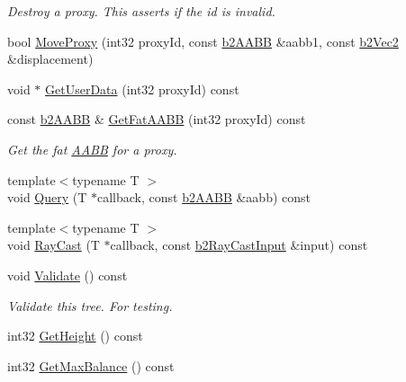 \begin{DoxyCompactItemize}
\begin{DoxyCompactList}\small\item\em Destroy a proxy. This asserts if the id is invalid. \end{DoxyCompactList}\item 
bool \hyperlink{classb2DynamicTree_a7748252811f3c575015931399cbe4daa}{Move\+Proxy} (int32 proxy\+Id, const \hyperlink{structb2AABB}{b2\+A\+A\+BB} \&aabb1, const \hyperlink{structb2Vec2}{b2\+Vec2} \&displacement)
\item 
void $\ast$ \hyperlink{classb2DynamicTree_aa8399f9440707780f267696098e8b920}{Get\+User\+Data} (int32 proxy\+Id) const
\item 
\mbox{\label{classb2DynamicTree_a655b9ddff43e4e0a34a372eddc03ecb9}} 
const \hyperlink{structb2AABB}{b2\+A\+A\+BB} \& \hyperlink{classb2DynamicTree_a655b9ddff43e4e0a34a372eddc03ecb9}{Get\+Fat\+A\+A\+BB} (int32 proxy\+Id) const
\begin{DoxyCompactList}\small\item\em Get the fat \hyperlink{classAABB}{A\+A\+BB} for a proxy. \end{DoxyCompactList}\item 
{\footnotesize template$<$typename T $>$ }\\void \hyperlink{classb2DynamicTree_a324df3eb65dfc22d3dcdca387737b193}{Query} (T $\ast$callback, const \hyperlink{structb2AABB}{b2\+A\+A\+BB} \&aabb) const
\item 
{\footnotesize template$<$typename T $>$ }\\void \hyperlink{classb2DynamicTree_aebd2dc6ee462e0cd0763a5f472243a13}{Ray\+Cast} (T $\ast$callback, const \hyperlink{structb2RayCastInput}{b2\+Ray\+Cast\+Input} \&input) const
\item 
\mbox{\label{classb2DynamicTree_ae9b989f0c04e38f9c940623d4e1728b9}} 
void \hyperlink{classb2DynamicTree_ae9b989f0c04e38f9c940623d4e1728b9}{Validate} () const
\begin{DoxyCompactList}\small\item\em Validate this tree. For testing. \end{DoxyCompactList}\item 
int32 \hyperlink{classb2DynamicTree_ae3c7dc771d596f1f95fd3a3d7f2f3e97}{Get\+Height} () const
\item 
int32 \hyperlink{classb2DynamicTree_a3feab170229e0acd17f6a4ad3fca406e}{Get\+Max\+Balance} () const
\item 

\end{DoxyCompactItemize}
